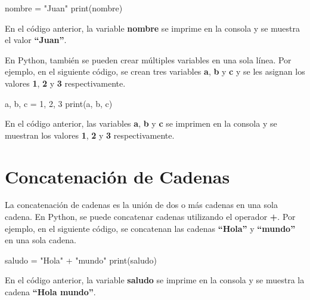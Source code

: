 \documentclass[
  a4paper,
  DIV=11,
  numbers=noendperiod,
  onepage,
  openany]{scrreprt}
\newenvironment{Shaded}{\begin{snugshade}}{\end{snugshade}}
\newcommand{\BuiltInTok}[1]{\textcolor[rgb]{0.00,0.23,0.31}{#1}}
\newcommand{\DecValTok}[1]{\textcolor[rgb]{0.68,0.00,0.00}{#1}}
\newcommand{\NormalTok}[1]{\textcolor[rgb]{0.00,0.23,0.31}{#1}}
\newcommand{\OperatorTok}[1]{\textcolor[rgb]{0.37,0.37,0.37}{#1}}
\newcommand{\StringTok}[1]{\textcolor[rgb]{0.13,0.47,0.30}{#1}}
\begin{document}
\begin{Shaded}
\begin{Highlighting}[]
\NormalTok{nombre }\OperatorTok{=} \StringTok{"Juan"}
\BuiltInTok{print}\NormalTok{(nombre)}
\end{Highlighting}
\end{Shaded}

En el código anterior, la variable \textbf{nombre} se imprime en la
consola y se muestra el valor \textbf{``Juan''}.

En Python, también se pueden crear múltiples variables en una sola
línea. Por ejemplo, en el siguiente código, se crean tres variables
\textbf{a}, \textbf{b} y \textbf{c} y se les asignan los valores
\textbf{1}, \textbf{2} y \textbf{3} respectivamente.

\begin{Shaded}
\begin{Highlighting}[]
\NormalTok{a, b, c }\OperatorTok{=} \DecValTok{1}\NormalTok{, }\DecValTok{2}\NormalTok{, }\DecValTok{3}
\BuiltInTok{print}\NormalTok{(a, b, c)}
\end{Highlighting}
\end{Shaded}

En el código anterior, las variables \textbf{a}, \textbf{b} y \textbf{c}
se imprimen en la consola y se muestran los valores \textbf{1},
\textbf{2} y \textbf{3} respectivamente.

\section{Concatenación de Cadenas}\label{concatenaciuxf3n-de-cadenas}

La concatenación de cadenas es la unión de dos o más cadenas en una sola
cadena. En Python, se puede concatenar cadenas utilizando el operador
\textbf{+}. Por ejemplo, en el siguiente código, se concatenan las
cadenas \textbf{``Hola''} y \textbf{``mundo''} en una sola cadena.

\begin{Shaded}
\begin{Highlighting}[]
\NormalTok{saludo }\OperatorTok{=} \StringTok{"Hola"} \OperatorTok{+} \StringTok{"mundo"}
\BuiltInTok{print}\NormalTok{(saludo)}
\end{Highlighting}
\end{Shaded}

En el código anterior, la variable \textbf{saludo} se imprime en la
consola y se muestra la cadena \textbf{``Hola mundo''}.
\end{document}

